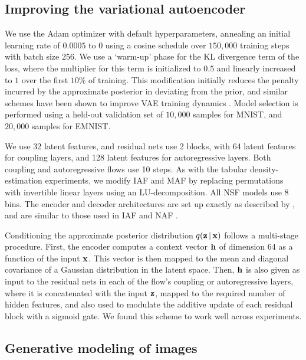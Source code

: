 \subsection{Improving the variational autoencoder}
We use the Adam optimizer \citep{kingma:2014:adam} with default hyperparameters, annealing an initial learning rate of $ 0.0005 $ to $ 0 $ using a cosine schedule \citep{loshchilov:2016:sgdr} over $ 150{,}000 $ training steps with batch size $ 256 $. 
We use a `warm-up' phase for the KL divergence term of the loss, where the multiplier for this term is initialized to $ 0.5 $ and linearly increased to $ 1 $ over the first $ 10\% $ of training. 
This modification initially reduces the penalty incurred by the approximate posterior in deviating from the prior, and similar schemes have been shown to improve VAE training dynamics \citep{rezende:2018:taming}. 
Model selection is performed using a held-out validation set of $ 10{,}000 $ samples for MNIST, and $ 20{,}000 $ samples for EMNIST\@.

We use 32 latent features, and residual nets use 2 blocks, with 64 latent features for coupling layers, and 128 latent features for autoregressive layers. 
Both coupling and autoregressive flows use 10 steps. 
As with the tabular density-estimation experiments, we modify IAF \citep{Kingma:2016:iaf} and MAF \citep{Papamakarios:2017:maf} by replacing permutations with invertible linear layers using an LU-decomposition. 
All NSF models use 8 bins. 
The encoder and decoder architectures are set up exactly as described by \citet{nash2019aem}, and are similar to those used in IAF \citep{Kingma:2016:iaf} and NAF \citep{Huang:2018:naf}. 

Conditioning the approximate posterior distribution $ q(\mathbf{z} \,\vert\, \mathbf{x}) $ follows a multi-stage procedure. 
First, the encoder computes a context vector $ \mathbf{h} $ of dimension $ 64 $ as a function of the input $ \mathbf{x} $. 
This vector is then mapped to the mean and diagonal covariance of a Gaussian distribution in the latent space. 
Then, $ \mathbf{h} $ is also given as input to the residual nets in each of the flow's coupling or autoregressive layers, where it is concatenated with the input $ \mathbf{z} $, mapped to the required number of hidden features, and also used to modulate the additive update of each residual block with a sigmoid gate. 
We found this scheme to work well across experiments.

\subsection{Generative modeling of images}

